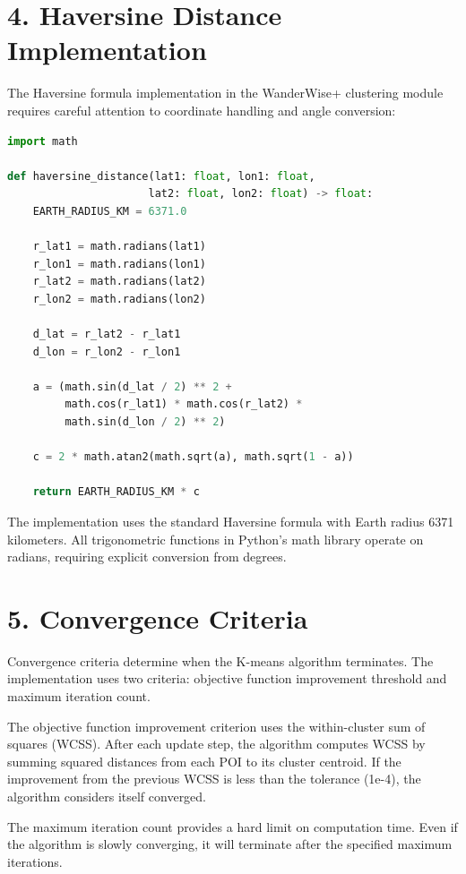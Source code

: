 \section{4. Haversine Distance Implementation}

The Haversine formula implementation in the WanderWise+ clustering module requires careful attention to coordinate handling and angle conversion:

\begin{lstlisting}[language=Python]
import math

def haversine_distance(lat1: float, lon1: float, 
                      lat2: float, lon2: float) -> float:
    EARTH_RADIUS_KM = 6371.0
    
    r_lat1 = math.radians(lat1)
    r_lon1 = math.radians(lon1)
    r_lat2 = math.radians(lat2)
    r_lon2 = math.radians(lon2)
    
    d_lat = r_lat2 - r_lat1
    d_lon = r_lon2 - r_lon1
    
    a = (math.sin(d_lat / 2) ** 2 +
         math.cos(r_lat1) * math.cos(r_lat2) * 
         math.sin(d_lon / 2) ** 2)
    
    c = 2 * math.atan2(math.sqrt(a), math.sqrt(1 - a))
    
    return EARTH_RADIUS_KM * c
\end{lstlisting}

The implementation uses the standard Haversine formula with Earth radius 6371 kilometers. All trigonometric functions in Python's math library operate on radians, requiring explicit conversion from degrees.

\section{5. Convergence Criteria}

Convergence criteria determine when the K-means algorithm terminates. The implementation uses two criteria: objective function improvement threshold and maximum iteration count.

The objective function improvement criterion uses the within-cluster sum of squares (WCSS). After each update step, the algorithm computes WCSS by summing squared distances from each POI to its cluster centroid. If the improvement from the previous WCSS is less than the tolerance (1e-4), the algorithm considers itself converged.

The maximum iteration count provides a hard limit on computation time. Even if the algorithm is slowly converging, it will terminate after the specified maximum iterations.

